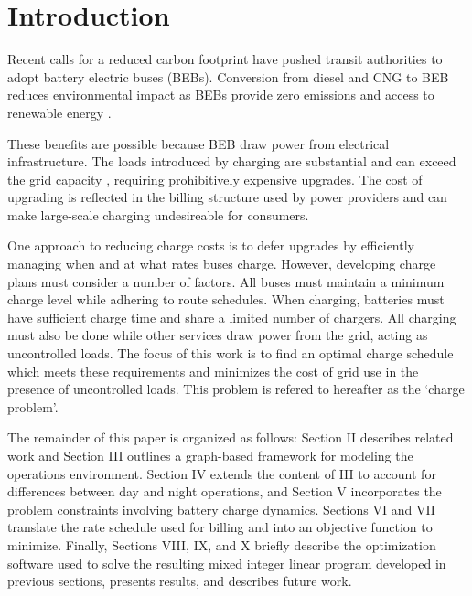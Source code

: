 \section{Introduction}
Recent calls for a reduced carbon footprint have pushed transit authorities to adopt battery electric buses (BEBs). Conversion from diesel and CNG to BEB reduces environmental impact \cite{zhou_optimization_2018} as BEBs provide zero emissions and access to renewable energy \cite{poornesh_comparative_2020}. 
\par These benefits are possible because BEB draw power from electrical infrastructure. The loads introduced by charging are substantial and can exceed the grid capacity \cite{stahleder_impact_2019}\cite{deb_impact_2017}\cite{boonraksa_impact_2019}, requiring prohibitively expensive upgrades. The cost of upgrading is reflected in the billing structure used by power providers and can make large-scale charging undesireable for consumers. 
\par One approach to reducing charge costs is to defer upgrades by efficiently managing when and at what rates buses charge. However, developing charge plans must consider a number of factors. All buses must maintain a minimum charge level while adhering to route schedules. When charging, batteries must have sufficient charge time and share a limited number of chargers. All charging must also be done while other services draw power from the grid, acting as uncontrolled loads. The focus of this work is to find an optimal charge schedule which meets these requirements and minimizes the cost of grid use in the presence of uncontrolled loads. This problem is refered to hereafter as the `charge problem'.  
\par The remainder of this paper is organized as follows: Section II describes related work and Section III outlines a graph-based framework for modeling the operations environment.  Section IV extends the content of III to account for differences between day and night operations, and Section V incorporates the problem constraints involving battery charge dynamics.  Sections VI and VII translate the rate schedule used for billing and into an objective function to minimize. Finally, Sections VIII, IX, and X briefly describe the optimization software used to solve the resulting mixed integer linear program developed in previous sections, presents results, and describes future work.
